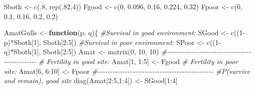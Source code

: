 \documentclass[
]{book}
\newenvironment{Shaded}{\begin{snugshade}}{\end{snugshade}}
\newcommand{\CommentTok}[1]{\textcolor[rgb]{0.56,0.35,0.01}{\textit{#1}}}
\newcommand{\ControlFlowTok}[1]{\textcolor[rgb]{0.13,0.29,0.53}{\textbf{#1}}}
\newcommand{\DecValTok}[1]{\textcolor[rgb]{0.00,0.00,0.81}{#1}}
\newcommand{\FloatTok}[1]{\textcolor[rgb]{0.00,0.00,0.81}{#1}}
\newcommand{\FunctionTok}[1]{\textcolor[rgb]{0.00,0.00,0.00}{#1}}
\newcommand{\NormalTok}[1]{#1}
\newcommand{\OtherTok}[1]{\textcolor[rgb]{0.56,0.35,0.01}{#1}}
\newcommand{\SpecialCharTok}[1]{\textcolor[rgb]{0.00,0.00,0.00}{#1}}
\begin{document}
\begin{Shaded}
\begin{Highlighting}[]
\NormalTok{Sboth }\OtherTok{\textless{}{-}} \FunctionTok{c}\NormalTok{(.}\DecValTok{8}\NormalTok{, }\FunctionTok{rep}\NormalTok{(.}\DecValTok{82}\NormalTok{,}\DecValTok{4}\NormalTok{))}
\NormalTok{Fgood }\OtherTok{\textless{}{-}} \FunctionTok{c}\NormalTok{(}\DecValTok{0}\NormalTok{, }\FloatTok{0.096}\NormalTok{, }\FloatTok{0.16}\NormalTok{, }\FloatTok{0.224}\NormalTok{, }\FloatTok{0.32}\NormalTok{) }
\NormalTok{Fpoor }\OtherTok{\textless{}{-}} \FunctionTok{c}\NormalTok{(}\DecValTok{0}\NormalTok{, }\FloatTok{0.1}\NormalTok{, }\FloatTok{0.16}\NormalTok{, }\FloatTok{0.2}\NormalTok{, }\FloatTok{0.2}\NormalTok{) }

\NormalTok{AmatGulls }\OtherTok{\textless{}{-}} \ControlFlowTok{function}\NormalTok{(p, q)\{}
  \CommentTok{\#Survival in good environment:}
\NormalTok{  SGood }\OtherTok{\textless{}{-}} \FunctionTok{c}\NormalTok{((}\DecValTok{1}\SpecialCharTok{{-}}\NormalTok{p)}\SpecialCharTok{*}\NormalTok{Sboth[}\DecValTok{1}\NormalTok{], Sboth[}\DecValTok{2}\SpecialCharTok{:}\DecValTok{5}\NormalTok{])}
  \CommentTok{\#Survival in poor environment:}
\NormalTok{  SPoor }\OtherTok{\textless{}{-}} \FunctionTok{c}\NormalTok{((}\DecValTok{1}\SpecialCharTok{{-}}\NormalTok{q)}\SpecialCharTok{*}\NormalTok{Sboth[}\DecValTok{1}\NormalTok{], Sboth[}\DecValTok{2}\SpecialCharTok{:}\DecValTok{5}\NormalTok{])}
\NormalTok{  Amat }\OtherTok{\textless{}{-}} \FunctionTok{matrix}\NormalTok{(}\DecValTok{0}\NormalTok{, }\DecValTok{10}\NormalTok{, }\DecValTok{10}\NormalTok{) }
  \CommentTok{\#{-}{-}{-}{-}{-}{-}{-}{-}{-}{-}{-}{-}{-}{-}{-}{-}{-}{-}{-}{-}{-}{-}{-}{-}{-}{-}{-}{-}{-}{-}{-}{-}{-}{-}{-}{-}{-}{-}{-}{-}{-}{-}{-}{-}{-}{-}{-}}
  \CommentTok{\# Fertility in good site:}
\NormalTok{  Amat[}\DecValTok{1}\NormalTok{, }\DecValTok{1}\SpecialCharTok{:}\DecValTok{5}\NormalTok{] }\OtherTok{\textless{}{-}}\NormalTok{ Fgood }
  \CommentTok{\# Fertility in poor site:}
\NormalTok{  Amat[}\DecValTok{6}\NormalTok{, }\DecValTok{6}\SpecialCharTok{:}\DecValTok{10}\NormalTok{] }\OtherTok{\textless{}{-}}\NormalTok{ Fpoor }
  \CommentTok{\#{-}{-}{-}{-}{-}{-}{-}{-}{-}{-}{-}{-}{-}{-}{-}{-}{-}{-}{-}{-}{-}{-}{-}{-}{-}{-}{-}{-}{-}{-}{-}{-}{-}{-}{-}{-}{-}{-}{-}{-}{-}{-}{-}{-}{-}{-}{-}}
  \CommentTok{\#P(survive and remain), good site}
  \FunctionTok{diag}\NormalTok{(Amat[}\DecValTok{2}\SpecialCharTok{:}\DecValTok{5}\NormalTok{,}\DecValTok{1}\SpecialCharTok{:}\DecValTok{4}\NormalTok{]) }\OtherTok{\textless{}{-}}\NormalTok{ SGood[}\DecValTok{1}\SpecialCharTok{:}\DecValTok{4}\NormalTok{] }

\end{Highlighting}
\end{Shaded}
\end{document}
